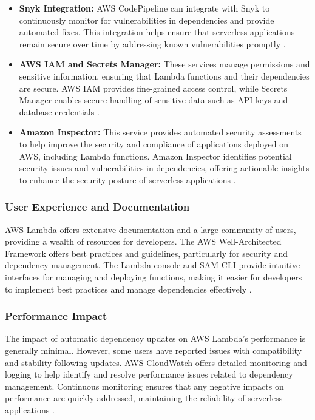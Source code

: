 \documentclass[sigconf]{acmart}
\begin{document}
\begin{itemize}
    \item \textbf{Snyk Integration:} AWS CodePipeline can integrate with Snyk to continuously monitor for vulnerabilities in dependencies and provide automated fixes. This integration helps ensure that serverless applications remain secure over time by addressing known vulnerabilities promptly \cite{snykaws2023}.
    \item \textbf{AWS IAM and Secrets Manager:} These services manage permissions and sensitive information, ensuring that Lambda functions and their dependencies are secure. AWS IAM provides fine-grained access control, while Secrets Manager enables secure handling of sensitive data such as API keys and database credentials \cite{awsSecurity2023}.
    \item \textbf{Amazon Inspector:} This service provides automated security assessments to help improve the security and compliance of applications deployed on AWS, including Lambda functions. Amazon Inspector identifies potential security issues and vulnerabilities in dependencies, offering actionable insights to enhance the security posture of serverless applications \cite{awsinspector2023}.
\end{itemize}

\subsubsection{User Experience and Documentation}

AWS Lambda offers extensive documentation and a large community of users, providing a wealth of resources for developers. The AWS Well-Architected Framework offers best practices and guidelines, particularly for security and dependency management. The Lambda console and SAM CLI provide intuitive interfaces for managing and deploying functions, making it easier for developers to implement best practices and manage dependencies effectively \cite{awsWell2023}.

\subsubsection{Performance Impact}

The impact of automatic dependency updates on AWS Lambda's performance is generally minimal. However, some users have reported issues with compatibility and stability following updates. AWS CloudWatch offers detailed monitoring and logging to help identify and resolve performance issues related to dependency management. Continuous monitoring ensures that any negative impacts on performance are quickly addressed, maintaining the reliability of serverless applications \cite{lambdaPerformance2023}.
\end{document}
